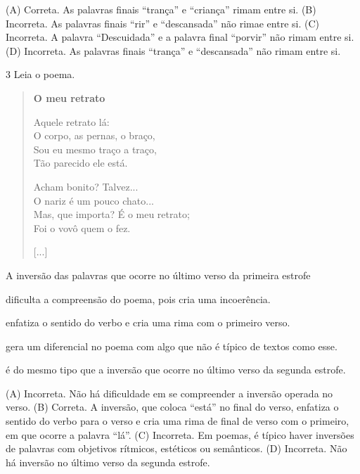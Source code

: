 (A) Correta. As palavras finais ``trança'' e ``criança'' rimam entre si.
(B) Incorreta. As palavras finais ``rir'' e ``descansada'' não rimae entre si.
(C) Incorreta. A palavra ``Descuidada'' e a palavra final ``porvir'' não rimam entre si.
(D) Incorreta. As palavras finais ``trança'' e ``descansada'' não rimam entre si.

\num{3} Leia o poema.

\begin{verse}
\textbf{O meu retrato}

Aquele retrato lá:\\
O corpo, as pernas, o braço,\\
Sou eu mesmo traço a traço,\\
Tão parecido ele está.

Acham bonito? Talvez...\\
O nariz é um pouco chato...\\
Mas, que importa? É o meu retrato;\\
Foi o vovô quem o fez.

{[}...{]}
\end{verse}


A inversão das palavras que ocorre no último verso da primeira estrofe

\begin{escolha}
\item dificulta a compreensão do poema, pois cria uma incoerência.

\item enfatiza o sentido do verbo e cria uma rima com o primeiro verso.

\item gera um diferencial no poema com algo que não é típico de textos como esse.

\item é do mesmo tipo que a inversão que ocorre no último verso da segunda estrofe.
\end{escolha}


(A) Incorreta. Não há dificuldade em se compreender a inversão operada no verso.
(B) Correta. A inversão, que coloca ``está'' no final do verso, enfatiza o sentido do verbo para o verso e cria uma rima de final de verso com o primeiro, em que ocorre a palavra ``lá''.
(C) Incorreta. Em poemas, é típico haver inversões de palavras com objetivos rítmicos, estéticos ou semânticos.
(D) Incorreta. Não há inversão no último verso da segunda estrofe.

